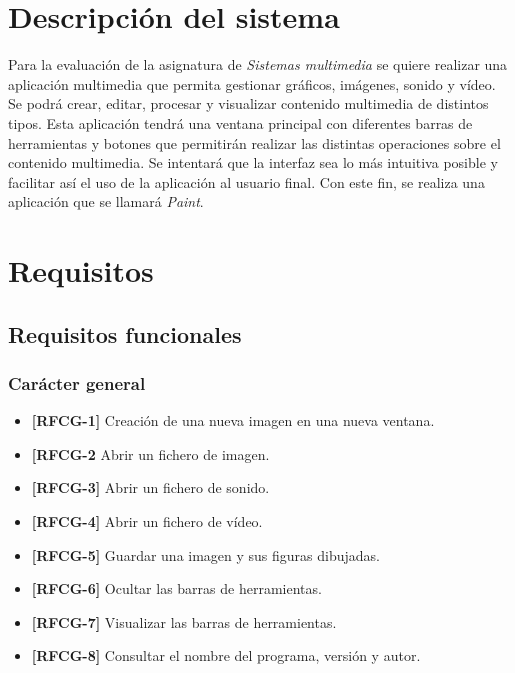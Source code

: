 \pagestyle{empty}
\maketitle
\vskip1cm
\clearpage
\tableofcontents
\clearpage
\setcounter{page}{1}
\pagestyle{plain}
\section{Descripción del sistema}
Para la evaluación de la asignatura de \textit{Sistemas multimedia} se quiere realizar una aplicación multimedia que permita gestionar gráficos, imágenes, sonido y vídeo. Se podrá crear, editar, procesar y visualizar contenido multimedia de distintos tipos.
\vskip0.3cm
Esta aplicación tendrá una ventana principal con diferentes barras de herramientas y botones que permitirán realizar las distintas operaciones sobre el contenido multimedia. Se intentará que la interfaz sea lo más intuitiva posible y facilitar así el uso de la aplicación al usuario final.
\vskip0.3cm
Con este fin, se realiza una aplicación que se llamará \textit{Paint}.
\section{Requisitos}
\subsection{Requisitos funcionales}
\subsubsection{Carácter general}
\begin{itemize}
\item{\textbf{[RFCG-1]} Creación de una nueva imagen en una nueva ventana.}
\item{\textbf{[RFCG-2} Abrir un fichero de imagen.}
\item{\textbf{[RFCG-3]} Abrir un fichero de sonido.}
\item{\textbf{[RFCG-4]} Abrir un fichero de vídeo.}
\item{\textbf{[RFCG-5]} Guardar una imagen y sus figuras dibujadas.}
\item{\textbf{[RFCG-6]} Ocultar las barras de herramientas.}
\item{\textbf{[RFCG-7]} Visualizar las barras de herramientas.}
\item{\textbf{[RFCG-8]} Consultar el nombre del programa, versión y autor.}
\end{itemize}
